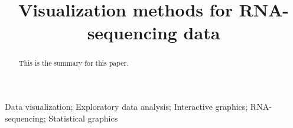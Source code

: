 \documentclass[useAMS,referee]{biom}
\title[Visualization methods for RNA-sequencing data]{Visualization methods for RNA-sequencing data}
\begin{document}





\label{firstpage}


\begin{abstract}
This is the summary for this paper.
\end{abstract}

%

\begin{keywords}
Data visualization; Exploratory data analysis; Interactive graphics; RNA-sequencing; Statistical graphics
\end{keywords}

\end{document}
